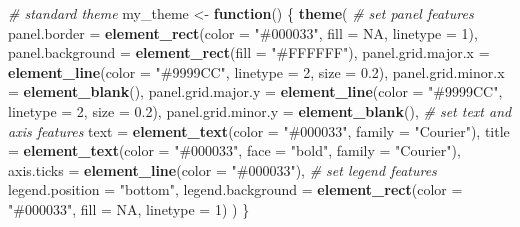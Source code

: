 \documentclass[
]{article}
\newenvironment{Shaded}{\begin{snugshade}}{\end{snugshade}}
\newcommand{\AttributeTok}[1]{\textcolor[rgb]{0.13,0.29,0.53}{#1}}
\newcommand{\CommentTok}[1]{\textcolor[rgb]{0.56,0.35,0.01}{\textit{#1}}}
\newcommand{\ConstantTok}[1]{\textcolor[rgb]{0.56,0.35,0.01}{#1}}
\newcommand{\ControlFlowTok}[1]{\textcolor[rgb]{0.13,0.29,0.53}{\textbf{#1}}}
\newcommand{\DecValTok}[1]{\textcolor[rgb]{0.00,0.00,0.81}{#1}}
\newcommand{\FloatTok}[1]{\textcolor[rgb]{0.00,0.00,0.81}{#1}}
\newcommand{\FunctionTok}[1]{\textcolor[rgb]{0.13,0.29,0.53}{\textbf{#1}}}
\newcommand{\NormalTok}[1]{#1}
\newcommand{\OtherTok}[1]{\textcolor[rgb]{0.56,0.35,0.01}{#1}}
\newcommand{\StringTok}[1]{\textcolor[rgb]{0.31,0.60,0.02}{#1}}
\begin{document}
\begin{Shaded}
\begin{Highlighting}[]
\CommentTok{\# standard theme}
\NormalTok{my\_theme }\OtherTok{\textless{}{-}} \ControlFlowTok{function}\NormalTok{() \{}
  \FunctionTok{theme}\NormalTok{(}
  \CommentTok{\# set panel features}
  \AttributeTok{panel.border =} \FunctionTok{element\_rect}\NormalTok{(}\AttributeTok{color =} \StringTok{"\#000033"}\NormalTok{, }\AttributeTok{fill =} \ConstantTok{NA}\NormalTok{, }\AttributeTok{linetype =} \DecValTok{1}\NormalTok{),}
  \AttributeTok{panel.background =} \FunctionTok{element\_rect}\NormalTok{(}\AttributeTok{fill =} \StringTok{"\#FFFFFF"}\NormalTok{),}
  \AttributeTok{panel.grid.major.x =} \FunctionTok{element\_line}\NormalTok{(}\AttributeTok{color =} \StringTok{"\#9999CC"}\NormalTok{, }\AttributeTok{linetype =} \DecValTok{2}\NormalTok{, }\AttributeTok{size =} \FloatTok{0.2}\NormalTok{),}
  \AttributeTok{panel.grid.minor.x =} \FunctionTok{element\_blank}\NormalTok{(),}
  \AttributeTok{panel.grid.major.y =} \FunctionTok{element\_line}\NormalTok{(}\AttributeTok{color =} \StringTok{"\#9999CC"}\NormalTok{, }\AttributeTok{linetype =} \DecValTok{2}\NormalTok{, }\AttributeTok{size =} \FloatTok{0.2}\NormalTok{),}
  \AttributeTok{panel.grid.minor.y =} \FunctionTok{element\_blank}\NormalTok{(),}
  \CommentTok{\# set text and axis features}
  \AttributeTok{text =} \FunctionTok{element\_text}\NormalTok{(}\AttributeTok{color =} \StringTok{"\#000033"}\NormalTok{, }\AttributeTok{family =} \StringTok{"Courier"}\NormalTok{),}
  \AttributeTok{title =} \FunctionTok{element\_text}\NormalTok{(}\AttributeTok{color =} \StringTok{"\#000033"}\NormalTok{, }\AttributeTok{face =} \StringTok{"bold"}\NormalTok{, }\AttributeTok{family =} \StringTok{"Courier"}\NormalTok{),}
  \AttributeTok{axis.ticks =} \FunctionTok{element\_line}\NormalTok{(}\AttributeTok{color =} \StringTok{"\#000033"}\NormalTok{),}
  \CommentTok{\# set legend features}
  \AttributeTok{legend.position =} \StringTok{"bottom"}\NormalTok{,}
  \AttributeTok{legend.background =} \FunctionTok{element\_rect}\NormalTok{(}\AttributeTok{color =} \StringTok{"\#000033"}\NormalTok{, }\AttributeTok{fill =} \ConstantTok{NA}\NormalTok{, }\AttributeTok{linetype =} \DecValTok{1}\NormalTok{)}
\NormalTok{  )}
\NormalTok{\}}


\end{Highlighting}
\end{Shaded}
\end{document}
